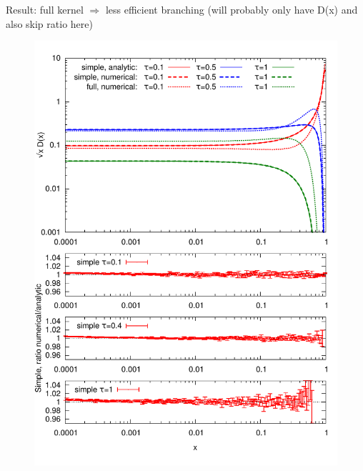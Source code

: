 \documentclass[pstricks,mathserif]{beamer}
\begin{document}
\begin{frame}

Result: full kernel $\Rightarrow$ less efficient branching
(will probably only have D(x) and also skip ratio here)
\begin{figure}
\centering
\includegraphics[width=1\linewidth]{times.pdf}
\endminipage\hfill
{}

\end{figure}
\end{frame}
\end{document}
